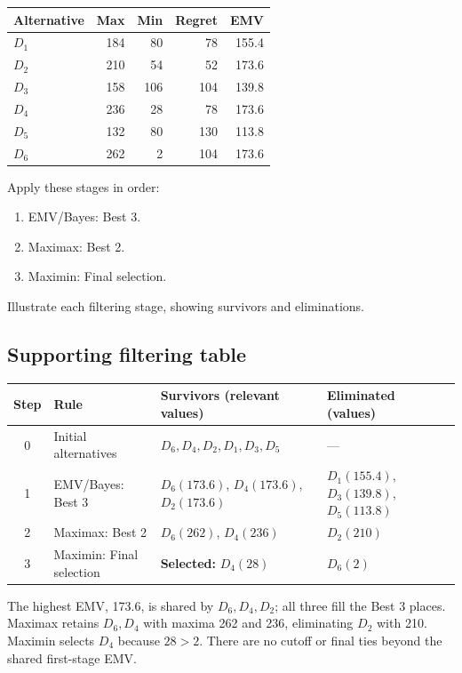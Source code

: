 \vspace{-3mm}
\begin{center}\small\setlength{\tabcolsep}{4pt}
	\begin{tabular}{lrrrr}\toprule
		Alternative & Max & Min & Regret & EMV\\ \midrule
		$D_1$ & 184 & 80 & 78 & 155.4\\
		$D_2$ & 210 & 54 & 52 & 173.6\\
		$D_3$ & 158 & 106 & 104 & 139.8\\
		$D_4$ & 236 & 28 & 78 & 173.6\\
		$D_5$ & 132 & 80 & 130 & 113.8\\
		$D_6$ & 262 & 2 & 104 & 173.6\\
		\bottomrule
	\end{tabular}
\end{center}
\vspace{-3mm}

Apply these stages in order:
\begin{enumerate}[leftmargin=*]
	\item EMV/Bayes: Best 3.
	\item Maximax: Best 2.
	\item Maximin: Final selection.
\end{enumerate}
Illustrate each filtering stage, showing survivors and eliminations.
\label{sol:q3table}
\subsection*{Supporting filtering table}
\begin{center}\small
\begin{tabularx}{\textwidth}{@{}c >{\raggedright\arraybackslash}p{} >{\raggedright\arraybackslash}X >{\raggedright\arraybackslash}p{}@{}}
\toprule
Step & Rule & Survivors (relevant values) & Eliminated (values)\\\midrule
0 & Initial alternatives & $D_6,D_4,D_2,D_1,D_3,D_5$ & ---\\
1 & EMV/Bayes: Best 3 & $D_6(173.6)$, $D_4(173.6)$, $D_2(173.6)$ & $D_1(155.4)$, $D_3(139.8)$, $D_5(113.8)$\\
2 & Maximax: Best 2 & $D_6(262)$, $D_4(236)$ & $D_2(210)$\\
3 & Maximin: Final selection & \textbf{Selected:} $D_4(28)$ & $D_6(2)$\\
\bottomrule\end{tabularx}
\end{center}
The highest EMV, 173.6, is shared by $D_6,D_4,D_2$; all three fill the Best 3 places. Maximax retains $D_6,D_4$ with maxima 262 and 236, eliminating $D_2$ with 210. Maximin selects $D_4$ because $28>2$. There are no cutoff or final ties beyond the shared first-stage EMV.
\secInicio[sec:q3]
\clearpage
{}\label{sol:q3tree}
